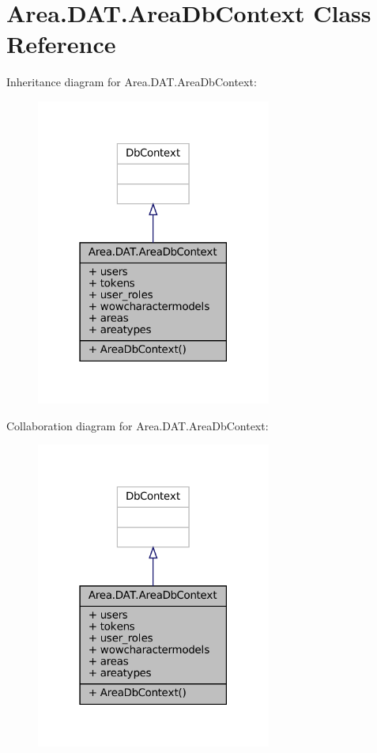 \hypertarget{classArea_1_1DAT_1_1AreaDbContext}{}\section{Area.\+D\+A\+T.\+Area\+Db\+Context Class Reference}
\label{classArea_1_1DAT_1_1AreaDbContext}


Inheritance diagram for Area.\+D\+A\+T.\+Area\+Db\+Context\+:
\nopagebreak
\begin{figure}[H]
\begin{center}
\leavevmode
\includegraphics[width=219pt]{classArea_1_1DAT_1_1AreaDbContext__inherit__graph}
\end{center}
\end{figure}


Collaboration diagram for Area.\+D\+A\+T.\+Area\+Db\+Context\+:
\nopagebreak
\begin{figure}[H]
\begin{center}
\leavevmode
\includegraphics[width=219pt]{classArea_1_1DAT_1_1AreaDbContext__coll__graph}
\end{center}
\end{figure}
